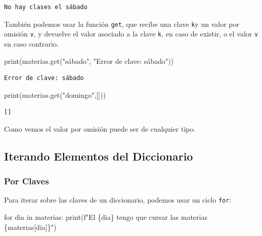 \documentclass[
  letterpaper,
  DIV=11,
  numbers=noendperiod]{scrreprt}
\newenvironment{Shaded}{\begin{snugshade}}{\end{snugshade}}
\newcommand{\BuiltInTok}[1]{\textcolor[rgb]{0.00,0.23,0.31}{#1}}
\newcommand{\ControlFlowTok}[1]{\textcolor[rgb]{0.00,0.23,0.31}{#1}}
\newcommand{\KeywordTok}[1]{\textcolor[rgb]{0.00,0.23,0.31}{#1}}
\newcommand{\NormalTok}[1]{\textcolor[rgb]{0.00,0.23,0.31}{#1}}
\newcommand{\SpecialCharTok}[1]{\textcolor[rgb]{0.37,0.37,0.37}{#1}}
\newcommand{\SpecialStringTok}[1]{\textcolor[rgb]{0.13,0.47,0.30}{#1}}
\newcommand{\StringTok}[1]{\textcolor[rgb]{0.13,0.47,0.30}{#1}}
\begin{document}
\begin{verbatim}
No hay clases el sábado
\end{verbatim}

También podemos usar la función \texttt{get}, que recibe una clave
\texttt{k}y un valor por omisión \texttt{v}, y devuelve el valor
asociado a la clave \texttt{k}, en caso de existir, o el valor
\texttt{v} en caso contrario.

\begin{Shaded}
\begin{Highlighting}[]
\BuiltInTok{print}\NormalTok{(materias.get(}\StringTok{"sábado"}\NormalTok{, }\StringTok{"Error de clave: sábado"}\NormalTok{))}
\end{Highlighting}
\end{Shaded}

\begin{verbatim}
Error de clave: sábado
\end{verbatim}

\begin{Shaded}
\begin{Highlighting}[]
\BuiltInTok{print}\NormalTok{(materias.get(}\StringTok{"domingo"}\NormalTok{,[]))}
\end{Highlighting}
\end{Shaded}

\begin{verbatim}
[]
\end{verbatim}

Como vemos el valor por omisión puede ser de cualquier tipo.

\subsection{Iterando Elementos del
Diccionario}\label{iterando-elementos-del-diccionario}

\subsubsection{Por Claves}\label{por-claves}

Para iterar sobre las claves de un diccionario, podemos usar un ciclo
\texttt{for}:

\begin{Shaded}
\begin{Highlighting}[]
\ControlFlowTok{for}\NormalTok{ dia }\KeywordTok{in}\NormalTok{ materias:}
    \BuiltInTok{print}\NormalTok{(}\SpecialStringTok{f"El }\SpecialCharTok{\{}\NormalTok{dia}\SpecialCharTok{\}}\SpecialStringTok{ tengo que cursar las materias }\SpecialCharTok{\{}\NormalTok{materias[dia]}\SpecialCharTok{\}}\SpecialStringTok{"}\NormalTok{)}
\end{Highlighting}
\end{Shaded}
\end{document}
